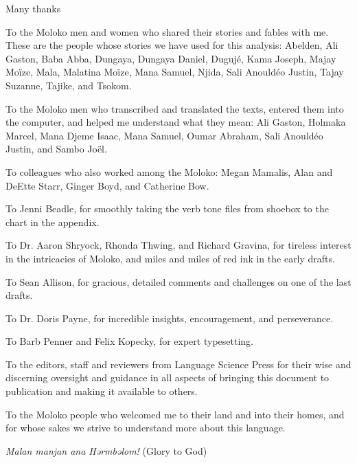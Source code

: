 Many thanks

To the Moloko men and women who shared their stories and fables with me.  These are the people whose stories we have used for this analysis: Abelden, Ali Gaston, Baba Abba, Dungaya, Dungaya Daniel, Dugujé, Kama Joseph, Majay Moïze, Mala, Malatina Moïze, Mana Samuel, Njida, Sali Anouldéo Justin, Tajay Suzanne, Tajike, and Tsokom.

To the Moloko men who transcribed and translated the texts, entered them into the computer, and helped me understand what they mean: Ali Gaston, Holmaka Marcel, Mana Djeme Isaac, Mana Samuel, Oumar Abraham, Sali Anouldéo Justin, and Sambo Joël.

To colleagues who also worked among the Moloko:  Megan Mamalis, Alan and DeEtte Starr, Ginger Boyd, and Catherine Bow.  

To Jenni Beadle, for smoothly taking the verb tone files from shoebox to the chart in the appendix.

To Dr. Aaron Shryock, Rhonda Thwing, and Richard Gravina, for tireless interest in the intricacies of Moloko, and miles and miles of red ink in the early drafts.

To Sean Allison, for gracious, detailed comments and challenges on one of the last drafts.

To Dr. Doris Payne, for incredible insights, encouragement, and perseverance. 

To Barb Penner and Felix Kopecky, for expert typesetting. 

To the editors, staff and reviewers from Language Science Press for their wise and discerning oversight and guidance in all aspects of bringing this document to publication and making it available to others. 

To the Moloko people who welcomed me to their land and into their homes, and for whose sakes we strive to understand more about this language.  

\textit{Malan manjan ana Hərmbəlom!} (Glory to God)